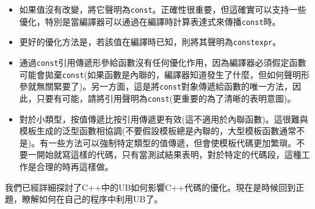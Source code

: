 \begin{itemize}
\item 
如果值沒有改變，將它聲明為\texttt{const}。正確性很重要，但這確實可以支持一些優化，特別是當編譯器可以通過在編譯時計算表達式來傳播\texttt{const}時。

\item 
更好的優化方法是，若該值在編譯時已知，則將其聲明為\texttt{constexpr}。

\item 
通過\texttt{const}引用傳遞形參給函數沒有任何優化作用，因為編譯器必須假定函數可能會拋棄\texttt{const}(如果函數是內聯的，編譯器知道發生了什麼，但如何聲明形參就無關緊要了)。另一方面，這是將\texttt{const}對象傳遞給函數的唯一方法，因此，只要有可能，請將引用聲明為\texttt{const}(更重要的為了清晰的表明意圖)。

\item 
對於小類型，按值傳遞比按引用傳遞更有效(這不適用於內聯函數)。這很難與模板生成的泛型函數相協調(不要假設模板總是內聯的，大型模板函數通常不是)。有一些方法可以強制特定類型的值傳遞，但會使模板代碼更加繁瑣。不要一開始就寫這樣的代碼，只有當測試結果表明，對於特定的代碼段，這種工作是合理的時再這樣做。

\end{itemize}

我們已經詳細探討了C++中的UB如何影響C++代碼的優化。現在是時候回到正題，瞭解如何在自己的程序中利用UB了。
























